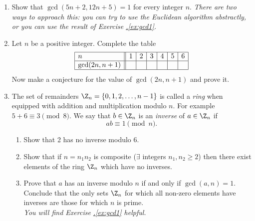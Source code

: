 \begin{enumerate}
  \item Show that $\gcd(5n+2,12n+5)=1$ for every integer $n$. \emph{There are two ways to approach this: you can try to use the Euclidean algorithm abstractly, or you can use the result of Exercise \hyperref[ex:gcd1]{\thesubsection.\ref*{ex:gcd1}}.}
  
  \item Let $n$ be a positive integer. Complete the table
  \[\begin{array}{|l||c|c|c|c|c|c|}
  \hline
  n&1&2&3&4&5&6\\\hline
  \gcd(2n,n+1)&&&&&&\\\hline
  \end{array}\]
  Now make a conjecture for the value of $\gcd(2n,n+1)$ and prove it.
  
  \item The set of remainders $\Z_n=\{0,1,2,\ldots,n-1\}$ is called a \emph{ring} when equipped with addition and multiplication modulo $n$. For example $5+6\equiv 3\pmod{8}$. We say that $b\in\Z_n$ is an \emph{inverse} of $a\in\Z_n$ if
	\[ab\equiv 1\pmod n.\]
	\begin{enumerate}
	  \item Show that 2 has no inverse modulo 6.
	  \item Show that if $n=n_1n_2$ is composite ($\exists$ integers $n_1,n_2\ge 2$) then there exist elements of the ring $\Z_n$ which have no inverses.
	  \item Prove that $a$ has an inverse modulo $n$ if and only if $\gcd(a,n)=1$. Conclude that the only sets $\Z_n$ for which all non-zero elements have inverses are those for which $n$ is prime.\\
	  \emph{You will find Exercise \hyperref[ex:gcd1]{\thesubsection.\ref*{ex:gcd1}} helpful.}
	\end{enumerate}
\end{enumerate}

\fi